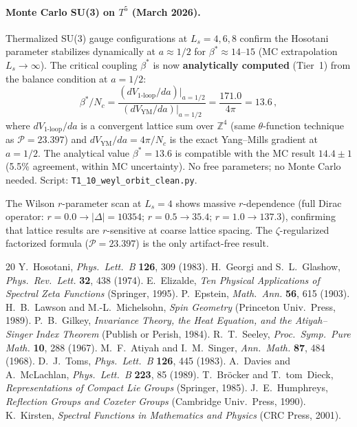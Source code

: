 \documentclass[11pt,a4paper]{article}
\begin{document}
\paragraph{Monte Carlo SU(3) on $T^5$ (March 2026).}
Thermalized SU(3) gauge configurations at $L_s=4,6,8$ confirm
the Hosotani parameter stabilizes dynamically at $a\approx 1/2$
for $\beta^*\approx 14$--$15$ (MC extrapolation $L_s\to\infty$).
The critical coupling $\beta^*$ is now \textbf{analytically computed}
(Tier~1) from the balance condition at $a=1/2$:
\begin{equation}
  \beta^*/N_c = \frac{(dV_{\mathrm{1\text{-}loop}}/da)|_{a=1/2}}
                     {(dV_{\mathrm{YM}}/da)|_{a=1/2}}
  = \frac{171.0}{4\pi} = 13.6\,,
\end{equation}
where $dV_{\mathrm{1\text{-}loop}}/da$ is a convergent lattice sum over
$\mathbb{Z}^4$ (same $\theta$-function technique as $\mathcal{P}=23.397$)
and $dV_{\mathrm{YM}}/da = 4\pi/N_c$ is the exact Yang--Mills gradient
at $a=1/2$.  The analytical value $\beta^*=13.6$ is compatible with
the MC result $14.4\pm 1$ (5.5\% agreement, within MC uncertainty).
No free parameters; no Monte Carlo needed.
Script: \texttt{T1\_10\_weyl\_orbit\_clean.py}.

The Wilson $r$-parameter scan at $L_s=4$ shows massive $r$-dependence
(full Dirac operator: $r{=}0.0\to|\Delta|{=}10354$;
$r{=}0.5\to 35.4$; $r{=}1.0\to 137.3$), confirming that lattice
results are $r$-sensitive at coarse lattice spacing.
The $\zeta$-regularized factorized formula ($\mathcal{P}=23.397$) is
the only artifact-free result.

\begin{thebibliography}{20}
  Y.~Hosotani, \emph{Phys.\ Lett.\ B} \textbf{126}, 309 (1983).
  H.~Georgi and S.~L.~Glashow, \emph{Phys.\ Rev.\ Lett.} \textbf{32}, 438 (1974).
  E.~Elizalde, \emph{Ten Physical Applications of Spectral Zeta Functions}
  (Springer, 1995).
  P.~Epstein, \emph{Math.\ Ann.} \textbf{56}, 615 (1903).
  H.~B.~Lawson and M.-L.~Michelsohn,
  \emph{Spin Geometry} (Princeton Univ.\ Press, 1989).
  P.~B.~Gilkey, \emph{Invariance Theory, the Heat Equation, and the
  Atiyah--Singer Index Theorem} (Publish or Perish, 1984).
  R.~T.~Seeley, \emph{Proc.\ Symp.\ Pure Math.} \textbf{10}, 288 (1967).
  M.~F.~Atiyah and I.~M.~Singer, \emph{Ann.\ Math.} \textbf{87}, 484 (1968).
  D.~J.~Toms, \emph{Phys.\ Lett.\ B} \textbf{126}, 445 (1983).
  A.~Davies and A.~McLachlan, \emph{Phys.\ Lett.\ B} \textbf{223}, 85 (1989).
  T.~Br\"ocker and T.~tom~Dieck,
  \emph{Representations of Compact Lie Groups} (Springer, 1985).
  J.~E.~Humphreys, \emph{Reflection Groups and Coxeter Groups}
  (Cambridge Univ.\ Press, 1990).
  K.~Kirsten, \emph{Spectral Functions in Mathematics and Physics}
  (CRC Press, 2001).
\end{thebibliography}
\end{document}
